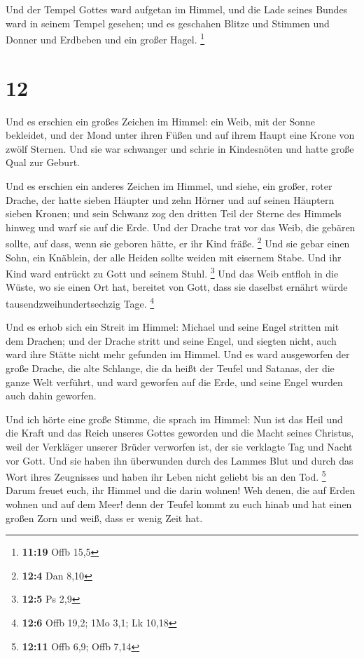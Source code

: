  Und der Tempel Gottes ward aufgetan im Himmel, und die
Lade seines Bundes ward in seinem Tempel gesehen; und es geschahen
Blitze und Stimmen und Donner und Erdbeben und ein großer Hagel.
\footnote{\textbf{11:19} Offb 15,5}

\hypertarget{section-3}{%
\section{12}\label{section-3}}

 Und es erschien ein großes Zeichen im Himmel: ein Weib,
mit der Sonne bekleidet, und der Mond unter ihren Füßen und auf ihrem
Haupt eine Krone von zwölf Sternen.  Und sie war schwanger
und schrie in Kindesnöten und hatte große Qual zur Geburt.

 Und es erschien ein anderes Zeichen im Himmel, und siehe,
ein großer, roter Drache, der hatte sieben Häupter und zehn Hörner und
auf seinen Häuptern sieben Kronen;  und sein Schwanz zog
den dritten Teil der Sterne des Himmels hinweg und warf sie auf die
Erde. Und der Drache trat vor das Weib, die gebären sollte, auf dass,
wenn sie geboren hätte, er ihr Kind fräße. \footnote{\textbf{12:4} Dan
  8,10}  Und sie gebar einen Sohn, ein Knäblein, der alle
Heiden sollte weiden mit eisernem Stabe. Und ihr Kind ward entrückt zu
Gott und seinem Stuhl. \footnote{\textbf{12:5} Ps 2,9} 
Und das Weib entfloh in die Wüste, wo sie einen Ort hat, bereitet von
Gott, dass sie daselbst ernährt würde tausendzweihundertsechzig Tage.
\footnote{\textbf{12:6} Offb 19,2; 1Mo 3,1; Lk 10,18}

 Und es erhob sich ein Streit im Himmel: Michael und seine
Engel stritten mit dem Drachen; und der Drache stritt und seine Engel,
 und siegten nicht, auch ward ihre Stätte nicht mehr
gefunden im Himmel.  Und es ward ausgeworfen der große
Drache, die alte Schlange, die da heißt der Teufel und Satanas, der die
ganze Welt verführt, und ward geworfen auf die Erde, und seine Engel
wurden auch dahin geworfen.

 Und ich hörte eine große Stimme, die sprach im Himmel:
Nun ist das Heil und die Kraft und das Reich unseres Gottes geworden und
die Macht seines Christus, weil der Verkläger unserer Brüder verworfen
ist, der sie verklagte Tag und Nacht vor Gott.  Und sie
haben ihn überwunden durch des Lammes Blut und durch das Wort ihres
Zeugnisses und haben ihr Leben nicht geliebt bis an den Tod. \footnote{\textbf{12:11}
  Offb 6,9; Offb 7,14}  Darum freuet euch, ihr Himmel und
die darin wohnen! Weh denen, die auf Erden wohnen und auf dem Meer! denn
der Teufel kommt zu euch hinab und hat einen großen Zorn und weiß, dass
er wenig Zeit hat.

